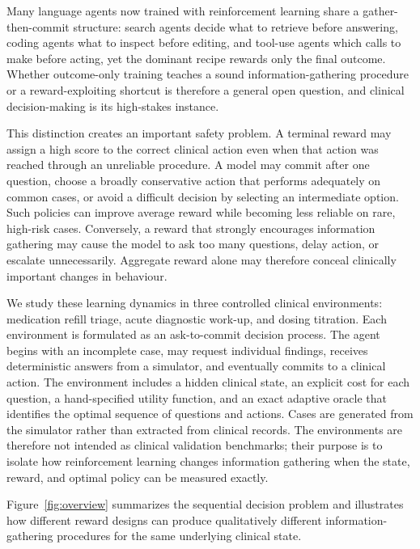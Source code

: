 \documentclass{article}
\begin{document}
Many language agents now trained with reinforcement learning share a gather-then-commit
structure: search agents decide what to retrieve before answering, coding agents what to
inspect before editing, and tool-use agents which calls to make before acting, yet the
dominant recipe rewards only the final outcome. Whether outcome-only training teaches a
sound information-gathering procedure or a reward-exploiting shortcut is therefore a
general open question, and clinical decision-making is its high-stakes instance.

This distinction creates an important safety problem. A terminal reward may assign
a high score to the correct clinical action even when that action was reached through
an unreliable procedure. A model may commit after one question, choose a broadly
conservative action that performs adequately on common cases, or avoid a difficult
decision by selecting an intermediate option. Such policies can improve average
reward while becoming less reliable on rare, high-risk cases. Conversely, a reward
that strongly encourages information gathering may cause the model to ask too many
questions, delay action, or escalate unnecessarily. Aggregate reward alone may
therefore conceal clinically important changes in behaviour.

We study these learning dynamics in three controlled clinical environments:
medication refill triage, acute diagnostic work-up, and dosing titration. Each
environment is formulated as an ask-to-commit decision process. The agent begins
with an incomplete case, may request individual findings, receives deterministic
answers from a simulator, and eventually commits to a clinical action. The
environment includes a hidden clinical state, an explicit cost for each question,
a hand-specified utility function, and an exact adaptive oracle that identifies the
optimal sequence of questions and actions. Cases are generated from the simulator
rather than extracted from clinical records. The environments are therefore not
intended as clinical validation benchmarks; their purpose is to isolate how
reinforcement learning changes information gathering when the state, reward, and
optimal policy can be measured exactly.


Figure~\ref{fig:overview} summarizes the sequential decision problem and
illustrates how different reward designs can produce qualitatively different
information-gathering procedures for the same underlying clinical state.
\end{document}
